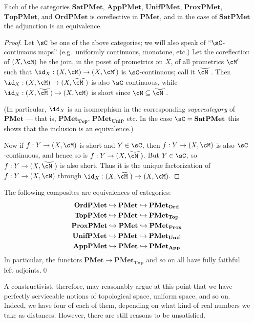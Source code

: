 \documentclass{article}
\def\sat#1{\widecheck{#1}}
\def\PMet{\mathbf{PMet}}
\def\PMetTop{\mathbf{PMet}_{\mathbf{Top}}}
\def\PMetUnif{\mathbf{PMet}_{\mathbf{Unif}}}
\def\PMetProx{\mathbf{PMet}_{\mathbf{Prox}}}
\def\PMetApp{\mathbf{PMet}_{\mathbf{App}}}
\def\PMetOrd{\mathbf{PMet}_{\mathbf{Ord}}}
\def\TopPMet{\mathbf{TopPMet}}
\def\UnifPMet{\mathbf{UnifPMet}}
\def\ProxPMet{\mathbf{ProxPMet}}
\def\AppPMet{\mathbf{AppPMet}}
\def\OrdPMet{\mathbf{OrdPMet}}
\def\SatPMet{\mathbf{SatPMet}}
\begin{document}
\begin{thm}
  Each of the categories $\SatPMet$, $\AppPMet$, $\UnifPMet$, $\ProxPMet$, $\TopPMet$, and $\OrdPMet$ is coreflective in $\PMet$, and in the case of $\SatPMet$ the adjunction is an equivalence.
\end{thm}
\begin{proof}
  Let $\sC$ be one of the above categories; we will also speak of ``$\sC$-continuous maps'' (e.g.\ uniformly continuous, monotone, etc.)
  Let the coreflection of $(X,\cM)$ be the join, in the poset of prometrics on $X$, of all prometrics $\cM'$ such that $\id_X :(X,\cM) \to (X,\cM')$ is $\sC$-continuous; call it $\sat{\cM}$.
  Then $\id_X :(X,\cM) \to (X,\sat{\cM})$ is also $\sC$-continuous, while $\id_X : (X,\sat{\cM}) \to (X,\cM)$ is short since $\cM \subseteq \sat{\cM}$.

  (In particular, $\id_X$ is an isomorphism in the corresponding \emph{supercategory} of $\PMet$ --- that is, $\PMetTop$, $\PMetUnif$, etc.
  In the case $\sC=\SatPMet$ this shows that the inclusion is an equivalence.)

  Now if $f:Y\to (X,\cM)$ is short and $Y\in\sC$, then $f:Y\to (X,\cM)$ is also $\sC$-continuous, and hence so is $f:Y\to (X,\sat{\cM})$.
  But $Y\in\sC$, so $f:Y\to (X,\sat{\cM})$ is also short.
  Thus it is the unique factorization of $f:Y\to (X,\cM)$ through $\id_X : (X,\sat{\cM}) \to (X,\cM)$.
\end{proof}

\begin{cor}
  The following composites are equivalences of categories:
  \begin{gather*}
    \OrdPMet \into \PMet \into \PMetOrd\\
    \TopPMet \into \PMet \into \PMetTop\\
    \ProxPMet \into \PMet \into \PMetProx\\
    \UnifPMet \into \PMet \into \PMetUnif\\
    \AppPMet \into \PMet \into \PMetApp
  \end{gather*}
  In particular, the functors $\PMet \to \PMetTop$ and so on all have fully faithful left adjoints.\qed
\end{cor}

A constructivist, therefore, may reasonably argue at this point that we have perfectly serviceable notions of topological space, uniform space, and so on.
Indeed, we have four of each of them, depending on what kind of real numbers we take as distances.
However, there are still reasons to be unsatisfied.
\end{document}
